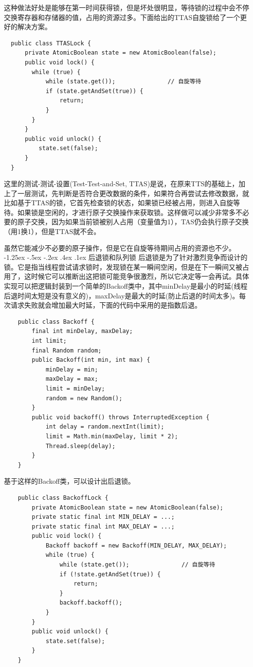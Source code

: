 \documentclass[a4paper, 11pt]{ctexart}
\makeatletter
\newcommand{\xiaosihao}{\fontsize{12pt}{\baselineskip}\selectfont}
\renewcommand\subsection{\@startsection{subsection}{1}{\z@}%
{-1.25ex \@plus -.5ex \@minus -.2ex}%
{.4ex \@plus .1ex}%
{\normalfont\xiaosihao\CJKfamily{hei}}}
\makeatother
\begin{document}
这种做法好处是能够在第一时间获得锁，但是坏处很明显，等待锁的过程中会不停交换寄存器和存储器的值，占用的资源过多。下面给出的TTAS自旋锁给了一个更好的解决方案。
\begin{lstlisting}
  public class TTASLock {
      private AtomicBoolean state = new AtomicBoolean(false);
      public void lock() {
        while (true) {
            while (state.get());               // 自旋等待
            if (state.getAndSet(true)) {
                return;
            }
        }         
      }
      public void unlock() {
          state.set(false);
      }
  }
\end{lstlisting}

这里的测试-测试-设置(Test-Test-and-Set, TTAS)是说，在原来TTS的基础上，加上了一层测试，先判断是否符合更改数据的条件，如果符合再尝试去修改数据，就比如基于TTAS的锁，它首先检查锁的状态，如果锁已经被占用，则进入自旋等待。如果锁是空闲的，才进行原子交换操作来获取锁。这样做可以减少非常多不必要的原子交换，因为如果当前锁被别人占用（变量值为1），TAS仍会执行原子交换（用1换1），但是TTAS就不会。

虽然它能减少不必要的原子操作，但是它在自旋等待期间占用的资源也不少。
\subsection{后退锁和队列锁}
后退锁是为了针对激烈竞争而设计的锁。它是指当线程尝试请求锁时，发现锁在某一瞬间空闲，但是在下一瞬间又被占用了，这时候它可以推断出这把锁可能竞争很激烈，所以它决定等一会再试。具体实现可以把逻辑封装到一个简单的Backoff类中，其中minDelay是最小的时延(线程后退时间太短是没有意义的)，maxDelay是最大的时延(防止后退的时间太多)。每次请求失败就会增加最大时延，下面的代码中采用的是指数后退。
\begin{lstlisting}
    public class Backoff {
        final int minDelay, maxDelay;
        int limit;
        final Random random;
        public Backoff(int min, int max) {
            minDelay = min;
            maxDelay = max;
            limit = minDelay;
            random = new Random();
        }
        public void backoff() throws InterruptedException {
            int delay = random.nextInt(limit);
            limit = Math.min(maxDelay, limit * 2);
            Thread.sleep(delay);
        }
    }
\end{lstlisting} 

基于这样的Backoff类，可以设计出后退锁。
\begin{lstlisting}
    public class BackoffLock {
        private AtomicBoolean state = new AtomicBoolean(false);
        private static final int MIN_DELAY = ...;
        private static final int MAX_DELAY = ...;
        public void lock() {
            Backoff backoff = new Backoff(MIN_DELAY, MAX_DELAY);
            while (true) {
                while (state.get());               // 自旋等待
                if (!state.getAndSet(true)) {
                    return;
                }
                backoff.backoff();
            }
        }
        public void unlock() {
            state.set(false);
        }
    }
\end{lstlisting}
\end{document}
